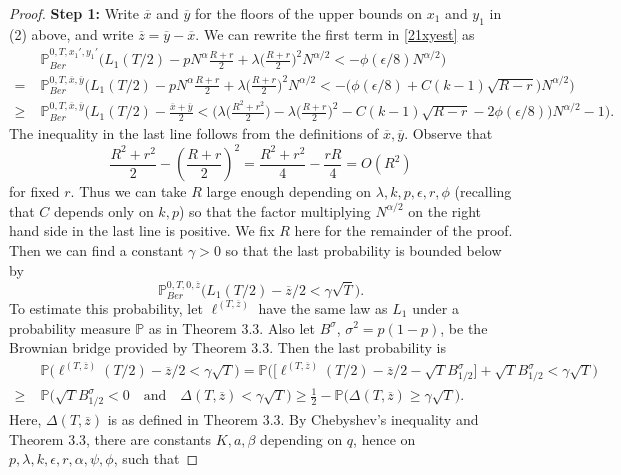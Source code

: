 \documentclass[12pt]{article}
\begin{document}
\begin{proof}
	\noindent\textbf{Step 1:} Write $\overline{x}$ and $\overline{y}$ for the floors of the upper bounds on $x_1$ and $y_1$ in (2) above, and write $\overline{z} = \overline{y}-\overline{x}$. We can rewrite the first term in \eqref{21xyest} as
	\begin{align*}
	&\mathbb{P}^{0,T,x_1',y_1'}_{Ber} \Big(L_1(T/2) - pN^\alpha \frac{R+r}{2} + \lambda\Big(\frac{R+r}{2}\Big)^2 N^{\alpha/2} < -\phi(\epsilon/8)N^{\alpha/2}\Big)\\
	= \; & \mathbb{P}^{0,T,\overline{x},\overline{y}}_{Ber}\Big(L_1(T/2) - pN^\alpha\frac{R+r}{2} + \lambda\Big(\frac{R+r}{2}\Big)^2 N^{\alpha/2} < -\big(\phi(\epsilon/8) + C(k-1)\sqrt{R-r}\big)N^{\alpha/2}\Big)\\
	\geq \; & \mathbb{P}^{0,T,\overline{x},\overline{y}}_{Ber}\Big(L_1(T/2) - \frac{\overline{x} + \overline{y}}{2} < \Big( \lambda\Big(\frac{R^2+r^2}{2}\Big) - \lambda\Big(\frac{R+r}{2}\Big)^2 - C(k-1)\sqrt{R-r} - 2\phi(\epsilon/8)\Big)N^{\alpha/2} - 1\Big).
	\end{align*}
	The inequality in the last line follows from the definitions of $\overline{x},\overline{y}$. Observe that
	\[
	\frac{R^2+r^2}{2} - \left(\frac{R+r}{2}\right)^2 = \frac{R^2 + r^2}{4} - \frac{rR}{4} = O(R^2)
	\]
	for fixed $r$. Thus we can take $R$ large enough depending on $\lambda,k,p,\epsilon,r,\phi$ (recalling that $C$ depends only on $k,p$) so that the factor multiplying $N^{\alpha/2}$ on the right hand side in the last line is positive. We fix $R$ here for the remainder of the proof. Then we can find a constant $\gamma>0$ so that the last probability is bounded below by
	\[
	\mathbb{P}^{0,T,0,\overline{z}}_{Ber}\Big(L_1(T/2) - \overline{z}/2 < \gamma\sqrt{T}\Big).
	\]
	To estimate this probability, let $\ell^{(T,\overline{z})}$ have the same law as $L_1$ under a probability measure $\mathbb{P}$ as in Theorem 3.3. Also let $B^\sigma$, $\sigma^2 = p(1-p)$, be the Brownian bridge provided by Theorem 3.3. Then the last probability is
	\begin{align*}
	& \mathbb{P}\Big( \ell^{(T,\overline{z})}(T/2) - \overline{z}/2 < \gamma\sqrt{T}\Big) = \mathbb{P}\Big(\Big[\ell^{(T,\overline{z})}(T/2) - \overline{z}/2 - \sqrt{T}B^\sigma_{1/2}\Big] + \sqrt{T}B^\sigma_{1/2} < \gamma\sqrt{T}\Big)\\
	\geq \; & \mathbb{P}\Big(\sqrt{T}B^\sigma_{1/2} < 0\quad\mathrm{and}\quad \Delta(T,\overline{z}) < \gamma\sqrt{T}\Big) \geq \frac{1}{2} - \mathbb{P}\Big(\Delta(T,\overline{z}) \geq \gamma\sqrt{T}\Big).
	\end{align*}
	Here, $\Delta(T,\overline{z})$ is as defined in Theorem 3.3. By Chebyshev's inequality and Theorem 3.3, there are constants $K,a,\beta$ depending on $q$, hence on $p,\lambda,k,\epsilon,r,\alpha,\psi,\phi$, such that 

\end{proof}
\end{document}
